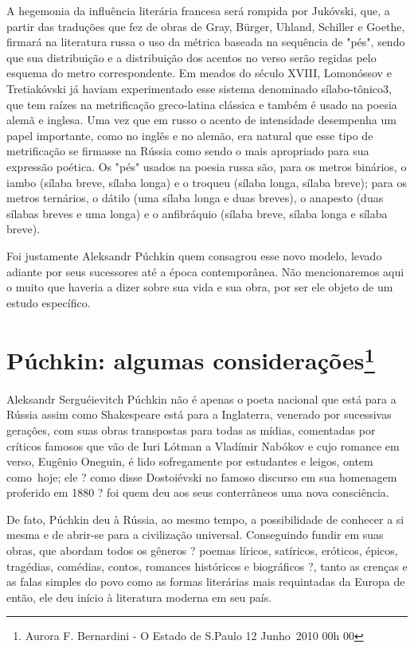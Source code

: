 A hegemonia da influência literária francesa será rompida por Jukóvski,
que, a partir das traduções que fez de obras de Gray, Bürger, Uhland,
Schiller e Goethe, firmará na literatura russa o uso da métrica baseada
na sequência de "pés", sendo que sua distribuição e a distribuição dos
acentos no verso serão regidas pelo esquema do metro correspondente. Em
meados do século XVIII, Lomonóssov e Tretiakóvski já haviam
experimentado esse sistema denomina­do sílabo-tônico3, que tem raízes na
metrificação greco-latina clássica e tam­bém é usado na poesia alemã e
inglesa. Uma vez que em russo o acento de intensidade desempenha um
papel importante, como no inglês e no alemão, era natural que esse tipo
de metrificação se firmasse na Rússia como sendo o mais apropriado para
sua expressão poética. Os "pés" usados na poesia russa são, para os
metros binários, o iambo (sílaba breve, sílaba longa) e o troqueu
(sílaba longa, sílaba breve); para os metros ternários, o dátilo (uma
sílaba lon­ga e duas breves), o anapesto (duas sílabas breves e uma
longa) e o anfibráquio (sílaba breve, sílaba longa e sílaba breve).

Foi justamente Aleksandr Púchkin quem consagrou esse novo modelo, levado
adiante por seus sucessores até a época contemporânea. Não mencionaremos
aqui o muito que haveria a dizer sobre sua vida e sua obra, por ser ele
objeto de um estudo específico.

\chapter{Púchkin: algumas considerações\footnote{Aurora F. Bernardini -
  O Estado de S.Paulo 12 Junho~2010 \textbar{} 00h 00}}

Aleksandr Serguéievitch Púchkin não é apenas o poeta nacional que está
para a Rússia assim como Shakespeare está para a Inglaterra, venerado
por sucessivas gerações, com suas obras transpostas para todas as
mídias, comentadas por críticos famosos que vão de Iuri Lótman a
Vladímir Nabókov e cujo romance em verso, Eugênio Oneguin, é lido
sofregamente por estudantes e leigos, ontem como~hoje; ele ? como disse
Dostoiévski no famoso discurso em sua homenagem proferido em 1880 ? foi
quem deu aos seus conterrâneos uma nova consciência.

De fato, Púchkin deu à Rússia, ao mesmo tempo, a possibilidade de
conhecer a si mesma e de abrir-se para a civilização universal.
Conseguindo fundir em suas obras, que abordam todos os gêneros ? poemas
líricos, satíricos, eróticos, épicos, tragédias, comédias, contos,
romances históricos e biográficos ?, tanto as crenças e as falas simples
do povo como as formas literárias mais requintadas da Europa de então,
ele deu início à literatura moderna em seu país.


